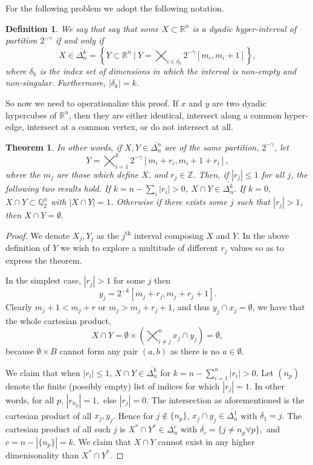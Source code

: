\documentclass[letter]{article}
\newtheorem{theorem}{Theorem}
\newtheorem{definition}{Definition}
\newenvironment{menumerate}{%
  \edef\backupindent{\the\parindent}%
  \enumerate%
  \setlength{\parindent}{\backupindent}%
}{\endenumerate}
\begin{document}
\begin{menumerate}
\begin{menumerate}
 			\item For the following problem we adopt the following notation.
 				\begin{definition}
 				 We say that say that some $X \subset \mathbb{R}^n$ is a dyadic hyper-interval of partition $2^{-\gamma}$ if and only if 
 				 $$X \in \overline{\Delta_n^k} = \left\{ Y \subset \mathbb{R}^n\ |\ Y = \bigtimes_{i\in\delta_k}2^{-\gamma}\left[m_i,m_i +1\right]\right 
 				 \},$$
 				 where $\delta_k$ is the index set of dimensions in which the interval is non-empty and non-singular. Furthermore, $|\delta_k| = k$.
 				 \end{definition}
 					So now we need to operationalize this proof. If $x$ and $y$ are two dyadic hypercubes of $\mathbb{R}^n$, then they are either identical, intersect along a common hyper-edge, intersect at a common vertex, or do not intersect at all.
				\begin{theorem}
					  In other words, if $X,Y \in \overline{\Delta_n^n}$ are of the same partition, $2^{-\gamma}$, let
					   $$Y = \bigtimes_{i=1}^k2^{-\gamma}\left[m_i+r_i,m_i +1 + r_i\right],$$ 
					   where the $m_j$ are those which define $X$, and $r_j \in \mathbb{Z}.$ Then, if $|r_j| \leq 1$ for all $j$, the following two results hold. If $k = n - \sum_i|r_i| > 0$,  $X \cap Y \in \overline{\Delta_n^k}$. If $k = 0$, $X \cap Y \subset \mathbb{Q}_2^n$ with $|X\cap Y| = 1$. Otherwise if there exists some $j$ such that $|r_j| > 1$, then $X \cap Y = \emptyset.$

				\end{theorem}
				\begin{proof}
					We denote $X_j, Y_j$ as the $j^\mathrm{th}$ interval composing $X$ and $Y$. In the above definition of $Y$ we wish to explore a multitude of different $r_j$ values so as to express the theorem.

					In the simplest case, $|r_j| > 1$ for some $j$ then $$y_j = 2^{-k}[m_j+r_j,m_j+r_j+1].$$ Clearly $m_j + 1 < m_j + r$ or $m_j  > m_j +r_j + 1$, and thus $y_j \cap x_j = \emptyset$, we have that the whole cartesian product, 
						$$X\cap Y = \emptyset \times \left(\bigtimes_{i\neq j}^n x_j\cap y_j\right) = \emptyset,$$ 
						because $\emptyset \times B$ cannot form any pair $(a,b)$ as there is no $a\in\emptyset.$

					We claim that when $|r_i| \leq 1 $, $X \cap Y\in \overline{\Delta_n^k}$ for $k = n - \sum_{i=1}^n|r_i| > 0.$ Let $(n_p)$ denote the finite (possibly empty) list of indices for which $|r_j| = 1.$ In other words, for all $p$, $|r_{n_p}| = 1,$ else $|r_j| = 0.$ The intersection as aforementioned is the cartesian product of all $x_j, y_j$. Hence for $j \notin \{n_p\}$,  $x_j \cap y_j \in \overline{\Delta_n^1}$ with $\delta_1 = {j}.$ The cartesian product of all such $j$ is $X^* \cap Y^* \in \overline{\Delta_n^c}$ with $\delta_{c} = \{j \neq n_p \forall p\},$ and $c= n-|\{n_p\}| = k.$ We claim that $X \cap Y$ cannot exist in any higher dimenisonality than $X^* \cap Y^*.$ 


\end{proof}
\end{menumerate}
\end{menumerate}
\end{document}
